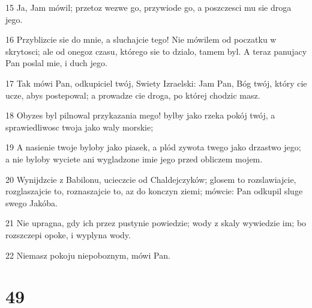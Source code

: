 \par 15 Ja, Jam mówil; przetoz wezwe go, przywiode go, a poszczesci mu sie droga jego.
\par 16 Przyblizcie sie do mnie, a sluchajcie tego! Nie mówilem od poczatku w skrytosci; ale od onegoz czasu, którego sie to dzialo, tamem byl. A teraz panujacy Pan poslal mie, i duch jego.
\par 17 Tak mówi Pan, odkupiciel twój, Swiety Izraelski: Jam Pan, Bóg twój, który cie ucze, abys postepowal; a prowadze cie droga, po której chodzic masz.
\par 18 Obyzes byl pilnowal przykazania mego! bylby jako rzeka pokój twój, a sprawiedliwosc twoja jako waly morskie;
\par 19 A nasienie twoje byloby jako piasek, a plód zywota twego jako drzastwo jego; a nie byloby wyciete ani wygladzone imie jego przed obliczem mojem.
\par 20 Wynijdzcie z Babilonu, ucieczcie od Chaldejczyków; glosem to rozslawiajcie, rozglaszajcie to, roznaszajcie to, az do konczyn ziemi; mówcie: Pan odkupil sluge swego Jakóba.
\par 21 Nie upragna, gdy ich przez pustynie powiedzie; wody z skaly wywiedzie im; bo rozszczepi opoke, i wyplyna wody.
\par 22 Niemasz pokoju niepoboznym, mówi Pan.

\chapter{49}

